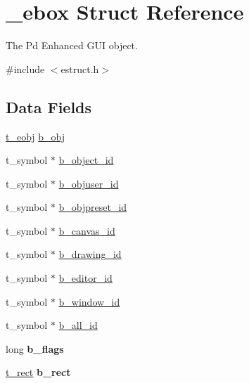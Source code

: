 \hypertarget{struct__ebox}{\section{\-\_\-ebox Struct Reference}
\label{struct__ebox}
}


The Pd Enhanced G\-U\-I object.  




{\ttfamily \#include $<$estruct.\-h$>$}

\subsection*{Data Fields}
\begin{DoxyCompactItemize}
\item 
\hyperlink{struct__eobj}{t\-\_\-eobj} \hyperlink{struct__ebox_a384a670299e98768527fbe457de9a38a}{b\-\_\-obj}
\item 
t\-\_\-symbol $\ast$ \hyperlink{struct__ebox_ae34af00c0a1b333cb06b30666f0ffc39}{b\-\_\-object\-\_\-id}
\item 
t\-\_\-symbol $\ast$ \hyperlink{struct__ebox_ae324f65e10196cc7e166652e8d7d394d}{b\-\_\-objuser\-\_\-id}
\item 
t\-\_\-symbol $\ast$ \hyperlink{struct__ebox_adc377263d208d1051f4a0997868b1155}{b\-\_\-objpreset\-\_\-id}
\item 
t\-\_\-symbol $\ast$ \hyperlink{struct__ebox_ac0251c6969a1032f8f50d076e909fb3e}{b\-\_\-canvas\-\_\-id}
\item 
t\-\_\-symbol $\ast$ \hyperlink{struct__ebox_a153f9c9929d722ecb29217f3fb0914c9}{b\-\_\-drawing\-\_\-id}
\item 
t\-\_\-symbol $\ast$ \hyperlink{struct__ebox_adf8c80c6ea45ad810c754984d98830ff}{b\-\_\-editor\-\_\-id}
\item 
t\-\_\-symbol $\ast$ \hyperlink{struct__ebox_a7033df943e798c68e3a6117785c2d79e}{b\-\_\-window\-\_\-id}
\item 
t\-\_\-symbol $\ast$ \hyperlink{struct__ebox_a0f63dcf604135dd4fbfbf43eaed53c1a}{b\-\_\-all\-\_\-id}
\item 
\hypertarget{struct__ebox_abdae234dbd983dfbfb0592858c4ff026}{long {\bfseries b\-\_\-flags}}\label{struct__ebox_abdae234dbd983dfbfb0592858c4ff026}

\item 
\hypertarget{struct__ebox_abc70ff46c135ee9f377a038bbc05a33e}{\hyperlink{struct__rect}{t\-\_\-rect} {\bfseries b\-\_\-rect}}\label{struct__ebox_abc70ff46c135ee9f377a038bbc05a33e}


\end{DoxyCompactItemize}
